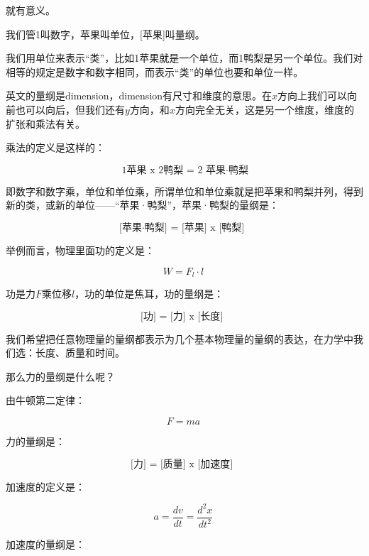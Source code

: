 就有意义。

我们管1叫数字，苹果叫单位，[苹果]叫量纲。

我们用单位来表示“类”，比如1苹果就是一个单位，而1鸭梨是另一个单位。我们对相等的规定是数字和数字相同，而表示“类”的单位也要和单位一样。

英文的量纲是dimension，dimension有尺寸和维度的意思。在$x$方向上我们可以向前也可以向后，但我们还有$y$方向，和$x$方向完全无关，这是另一个维度，维度的扩张和乘法有关。

乘法的定义是这样的：

\begin{equation}
\text{ 1苹果 x 2鸭梨 = 2 苹果·鸭梨}~
\end{equation}

即数字和数字乘，单位和单位乘，所谓单位和单位乘就是把苹果和鸭梨并列，得到新的类，或新的单位——“苹果·鸭梨”，苹果·鸭梨的量纲是：

\begin{equation}
\text{[苹果·鸭梨] = [苹果] x [鸭梨] }~
\end{equation}

举例而言，物理里面功的定义是：

\begin{equation}
W = F_l \cdot l~
\end{equation}

功是力$F$乘位移$l$，功的单位是焦耳，功的量纲是：

\begin{equation}
\text{[功] = [力] x [长度] }~
\end{equation}

我们希望把任意物理量的量纲都表示为几个基本物理量的量纲的表达，在力学中我们选：长度、质量和时间。

那么力的量纲是什么呢？

由牛顿第二定律：

\begin{equation}
F = m a~
\end{equation}

力的量纲是：

\begin{equation}
\text{[力] = [质量] x [加速度] }~
\end{equation}

加速度的定义是：

\begin{equation}
a = \frac{d v}{d t} = \frac{d^2 x}{dt^2}~
\end{equation}

加速度的量纲是：

